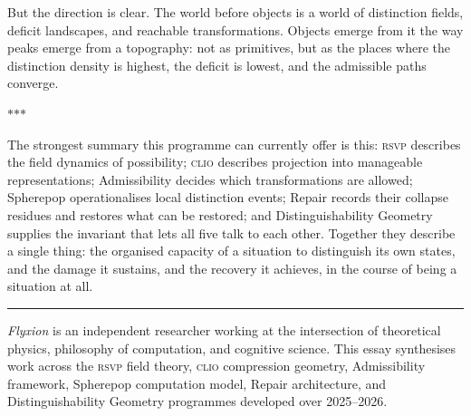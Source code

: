\documentclass[12pt, letterpaper]{article}
\theoremstyle{remark}
\newcommand{\rsvp}{\textsc{rsvp}}
\newcommand{\clio}{\textsc{clio}}
\begin{document}
But the direction is clear.  The world before objects is a world of
distinction fields, deficit landscapes, and reachable transformations.
Objects emerge from it the way peaks emerge from a topography: not as
primitives, but as the places where the distinction density is highest,
the deficit is lowest, and the admissible paths converge.

\bigskip
\begin{center}
$*$\quad$*$\quad$*$
\end{center}
\bigskip

\noindent The strongest summary this programme can currently offer is
this: \rsvp{} describes the field dynamics of possibility; \clio{} describes
projection into manageable representations; Admissibility decides which
transformations are allowed; Spherepop operationalises local distinction
events; Repair records their collapse residues and restores what can be
restored; and Distinguishability Geometry supplies the invariant that lets
all five talk to each other.  Together they describe a single thing: the
organised capacity of a situation to distinguish its own states, and the
damage it sustains, and the recovery it achieves, in the course of being
a situation at all.

\bigskip
\noindent\rule{\textwidth}{0.4pt}
\vspace{0.5em}

\noindent\textit{Flyxion} is an independent researcher working at the
intersection of theoretical physics, philosophy of computation, and cognitive
science.  This essay synthesises work across the \rsvp{} field theory,
\clio{} compression geometry, Admissibility framework, Spherepop computation
model, Repair architecture, and Distinguishability Geometry programmes
developed over 2025--2026.
\end{document}
